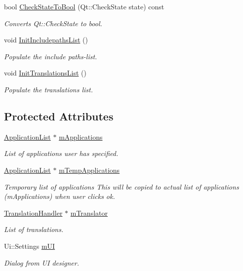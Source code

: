 \begin{DoxyCompactItemize}
bool \hyperlink{class_settings_dialog_a482df58862f120ecb3790cd5f8743de4}{Check\-State\-To\-Bool} (Qt\-::\-Check\-State state) const 
\begin{DoxyCompactList}\small\item\em Converts Qt\-::\-Check\-State to bool. \end{DoxyCompactList}\item 
void \hyperlink{class_settings_dialog_a9ce011769d3926a2afe650b9e47ffbac}{Init\-Includepaths\-List} ()
\begin{DoxyCompactList}\small\item\em Populate the include paths-\/list. \end{DoxyCompactList}\item 
void \hyperlink{class_settings_dialog_ad017698e4b28b20ea4e143423b906aef}{Init\-Translations\-List} ()
\begin{DoxyCompactList}\small\item\em Populate the translations list. \end{DoxyCompactList}\end{DoxyCompactItemize}
\subsection*{Protected Attributes}
\begin{DoxyCompactItemize}
\item 
\hyperlink{class_application_list}{Application\-List} $\ast$ \hyperlink{class_settings_dialog_aeac92444994de99cf7eb4fd11e0971aa}{m\-Applications}
\begin{DoxyCompactList}\small\item\em List of applications user has specified. \end{DoxyCompactList}\item 
\hyperlink{class_application_list}{Application\-List} $\ast$ \hyperlink{class_settings_dialog_a89e52a00a50a7ebabef52bc9d40be49e}{m\-Temp\-Applications}
\begin{DoxyCompactList}\small\item\em Temporary list of applications This will be copied to actual list of applications (m\-Applications) when user clicks ok. \end{DoxyCompactList}\item 
\hyperlink{class_translation_handler}{Translation\-Handler} $\ast$ \hyperlink{class_settings_dialog_a96aa44d2e7a49fb64141356b8945ed3f}{m\-Translator}
\begin{DoxyCompactList}\small\item\em List of translations. \end{DoxyCompactList}\item 
Ui\-::\-Settings \hyperlink{class_settings_dialog_af54179fb3fb2ace2ff4c6acc28a0efbf}{m\-U\-I}
\begin{DoxyCompactList}\small\item\em Dialog from U\-I designer. \end{DoxyCompactList}\end{DoxyCompactItemize}


